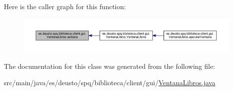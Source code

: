 Here is the caller graph for this function\+:
\nopagebreak
\begin{figure}[H]
\begin{center}
\leavevmode
\includegraphics[width=350pt]{classes_1_1deusto_1_1spq_1_1biblioteca_1_1client_1_1gui_1_1_ventana_libros_a6615018a56e392b80c49c4c49a94f55b_icgraph}
\end{center}
\end{figure}


The documentation for this class was generated from the following file\+:\begin{DoxyCompactItemize}
\item 
src/main/java/es/deusto/spq/biblioteca/client/gui/\mbox{\hyperlink{_ventana_libros_8java}{Ventana\+Libros.\+java}}\end{DoxyCompactItemize}
